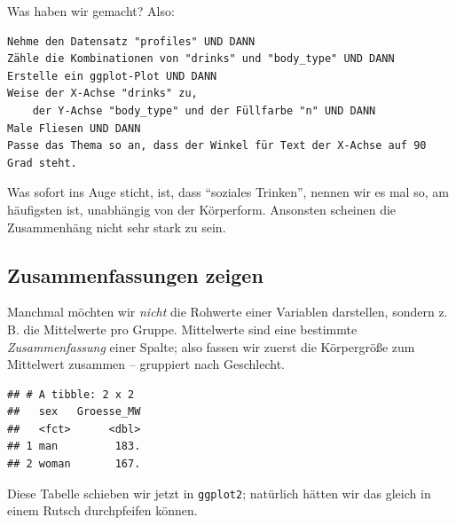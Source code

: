 \documentclass[12pt,ngerman,paper=a4,pagesize,DIV=13]{scrreprt}
\newenvironment{Shaded}{\begin{snugshade}}{\end{snugshade}}
\newcommand{\DataTypeTok}[1]{\textcolor[rgb]{0.13,0.29,0.53}{#1}}
\newcommand{\KeywordTok}[1]{\textcolor[rgb]{0.13,0.29,0.53}{\textbf{#1}}}
\newcommand{\NormalTok}[1]{#1}
\newcommand{\OperatorTok}[1]{\textcolor[rgb]{0.81,0.36,0.00}{\textbf{#1}}}
\newcommand{\StringTok}[1]{\textcolor[rgb]{0.31,0.60,0.02}{#1}}
\begin{document}
Was haben wir gemacht? Also:

\begin{verbatim}
Nehme den Datensatz "profiles" UND DANN  
Zähle die Kombinationen von "drinks" und "body_type" UND DANN  
Erstelle ein ggplot-Plot UND DANN  
Weise der X-Achse "drinks" zu, 
    der Y-Achse "body_type" und der Füllfarbe "n" UND DANN  
Male Fliesen UND DANN  
Passe das Thema so an, dass der Winkel für Text der X-Achse auf 90 Grad steht.  
\end{verbatim}

Was sofort ins Auge sticht, ist, dass \enquote{soziales Trinken}, nennen
wir es mal so, am häufigsten ist, unabhängig von der Körperform.
Ansonsten scheinen die Zusammenhäng nicht sehr stark zu sein.

\hypertarget{zusammenfassungen-zeigen}{%
\subsection{Zusammenfassungen zeigen}\label{zusammenfassungen-zeigen}}

Manchmal möchten wir \emph{nicht} die Rohwerte einer Variablen
darstellen, sondern z. B. die Mittelwerte pro Gruppe. Mittelwerte sind
eine bestimmte \emph{Zusammenfassung} einer Spalte; also fassen wir
zuerst die Körpergröße zum Mittelwert zusammen -- gruppiert nach
Geschlecht.

\begin{Shaded}
\end{Shaded}

\begin{verbatim}
## # A tibble: 2 x 2
##   sex   Groesse_MW
##   <fct>      <dbl>
## 1 man         183.
## 2 woman       167.
\end{verbatim}

Diese Tabelle schieben wir jetzt in \texttt{ggplot2}; natürlich hätten
wir das gleich in einem Rutsch durchpfeifen können.

\begin{Shaded}
\end{Shaded}
\end{document}
